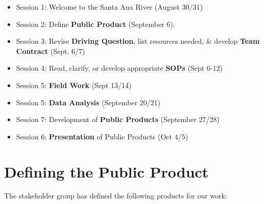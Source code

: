 \documentclass{tufte-handout}\usepackage[]{graphicx}\usepackage[]{color}
\begin{document}
\begin{itemize}
  \item Session 1: Welcome to the Santa Ana River (August 30/31)
  \item Session 2: Define \textbf{Public Product} (September 6).  
  \item Session 3: Revise \textbf{Driving Question}, list resources needed,  \& develop \textbf{Team Contract} (Sept. 6/7)
  \item Session 4: Read, clarify, or develop appropriate \textbf{SOPs} (Sept 6-12)
  \item Session 5: \textbf{Field Work} (Sept 13/14)
  \item Session 5: \textbf{Data Analysis} (September 20/21)
  \item Session 7: Development of \textbf{Public Products} (September 27/28)
  \item Session 6: \textbf{Presentation} of Public Products (Oct 4/5)
\end{itemize}

\section{Defining the Public Product}

The stakeholder group has defined the following products for our work:
\end{document}
